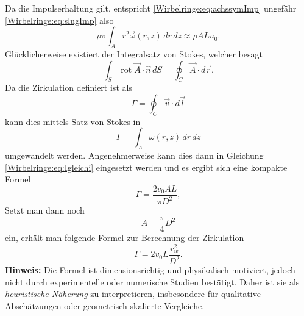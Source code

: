 Da die Impulserhaltung gilt, entspricht \eqref{Wirbelringe:eq:achssymImp} ungefähr \eqref{Wirbelringe:eq:slugImp} also
\begin{equation}
    \rho\pi\int_{A}r^2\vec{\omega}(r,z)\,dr\,dz
    \approx
    \rho ALu_0
    \label{Wirbelringe:eq:Igleichi}.
\end{equation}
Glücklicherweise existiert der Integralsatz von Stokes, welcher besagt
\begin{equation*}
    \int_{S}\operatorname{rot}\vec{A}\cdot\hat{n}\,dS 
    =
    \oint_{C}\vec{A}\cdot d\vec{r}.
\end{equation*}
Da die Zirkulation definiert ist als 
\begin{equation*}
    \Gamma
    =
    \oint_{C}\vec{v}\cdot d\vec{l}
\end{equation*}
kann dies mittels Satz von Stokes in
\begin{equation*}
    \Gamma
    =
    \int_{A}\omega(r,z)\,dr\,dz
\end{equation*}
umgewandelt werden.
Angenehmerweise kann dies dann in Gleichung \eqref{Wirbelringe:eq:Igleichi} eingesetzt werden und es ergibt sich eine kompakte Formel
\begin{equation*}
    \Gamma
    =
    \frac{2v_0AL}{\pi D^2},
\end{equation*}
Setzt man dann noch 
\begin{equation*}
    A
    =
    \frac{\pi}{4} D^2
\end{equation*}
ein, erhält man folgende Formel zur Berechnung der Zirkulation
\begin{equation*}
    \label{Wirbelringe:eq:naeherungZirkulation}
    \Gamma
    =
    2v_0L\frac{r_w^2}{D^2}.
\end{equation*}
\textbf{Hinweis:}
Die Formel ist dimensionsrichtig und physikalisch motiviert, jedoch nicht durch experimentelle oder numerische Studien bestätigt.
Daher ist sie als \emph{heuristische Näherung} zu interpretieren, insbesondere für qualitative Abschätzungen oder geometrisch skalierte Vergleiche.